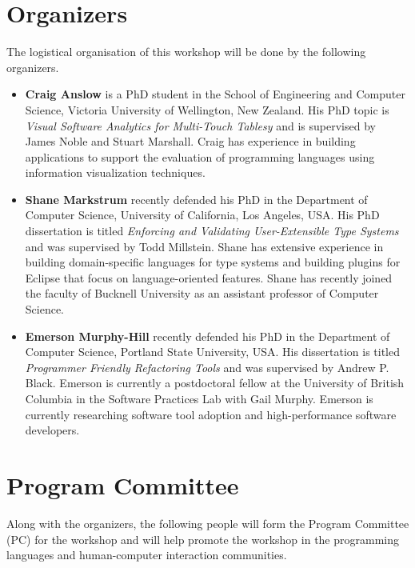 \documentclass{sigplanconf}
\begin{document}
\section{Organizers}

The logistical organisation of this workshop will be done by the following organizers.

\begin{itemize}
\item \textbf{Craig Anslow} is a PhD student in the School of
  Engineering and Computer Science, Victoria University of Wellington,
  New Zealand. His PhD topic is \emph{Visual Software Analytics for
   Multi-Touch Tablesy} and is supervised by James Noble and
  Stuart Marshall. Craig has experience in building applications to
  support the evaluation of programming languages using information
  visualization techniques.

\item \textbf{Shane Markstrum} recently defended his PhD in the
  Department of Computer Science, University of California, Los
  Angeles, USA. His PhD dissertation is titled \emph{Enforcing and
    Validating User-Extensible Type Systems} and was supervised by
  Todd Millstein. Shane has extensive experience in building
  domain-specific languages for type systems and building plugins for
  Eclipse that focus on language-oriented features. Shane has recently
  joined the faculty of Bucknell University as an assistant professor
  of Computer Science.

\item \textbf{Emerson Murphy-Hill} recently defended his PhD in the
  Department of Computer Science, Portland State University, USA. His
  dissertation is titled \emph{Programmer Friendly Refactoring Tools}
  and was supervised by Andrew P. Black. Emerson is currently a
  postdoctoral fellow at the University of British Columbia in the
  Software Practices Lab with Gail Murphy.  Emerson is currently
  researching software tool adoption and high-performance software
  developers.
\end{itemize}

\section{Program Committee}

Along with the organizers, the following people will form the Program
Committee (PC) for the workshop and will help promote the workshop in
the programming languages and human-computer interaction communities.
\end{document}
